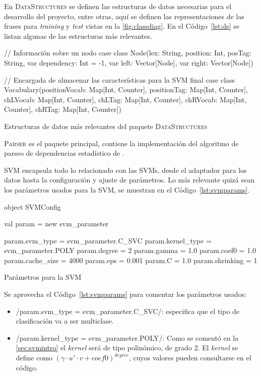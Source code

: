 En \textsc{DataStructures} se definen las estructuras de datos necesarias para
el desarrollo del proyecto, entre otras, aquí se definen las representaciones de
las frases para \emph{training} y \emph{test} vistas en la
\autoref{fig:classdiag}. En el Código~\ref{lst:ds} se listan algunas de las
estructuras más relevantes.
\begin{listing}[ht]
  \begin{scalacode}
    // Información sobre un nodo
    case class Node(lex: String,
                    position: Int,
                    posTag: String,
                    var dependency: Int = -1,
                    var left: Vector[Node],
                    var right: Vector[Node])

    // Encargada de almacenar las características para la SVM
    final case class Vocabulary(positionVocab: Map[Int, Counter],
                                positionTag: Map[Int, Counter],
                                chLVocab: Map[Int, Counter],
                                chLTag: Map[Int, Counter],
                                chRVocab: Map[Int, Counter],
                                chRTag: Map[Int, Counter])
  \end{scalacode}
  \caption{\footnotesize Estructuras de datos más relevantes del paquete
    \textsc{DataStructures}}
  \label{lst:ds}
\end{listing}

\textsc{Parser} es el paquete principal, contiene la implementación del
algoritmo de parseo de dependencias estadístico de \citeauthor{yamada2003}.

\textsc{SVM} encapsula todo lo relacionado con las \acp{SVM}, desde el adaptador
para los datos hasta la configuración y ajuste de parámetros. Lo más relevante
quizá sean los parámetros usados para la \ac{SVM}, se muestran en el
Código~\ref{lst:svmparams}.
\begin{listing}[ht]
  \begin{scalacode}
    object SVMConfig {
      val param = new svm_parameter

      param.svm_type = svm_parameter.C_SVC
      param.kernel_type = svm_parameter.POLY
      param.degree = 2
      param.gamma = 1.0
      param.coef0 = 1.0
      param.cache_size = 4000
      param.eps = 0.001
      param.C = 1.0
      param.shrinking = 1
    }
  \end{scalacode}
  \caption{Parámetros para la \ac{SVM}}
  \label{lst:svmparams}
\end{listing}
Se aprovecha el Código~\ref{lst:svmparams} para comentar los parámetros usados:
\begin{itemize}
\item \scalainline/param.svm_type = svm_parameter.C_SVC/: especifica que el tipo
  de clasificación va a ser multiclase.
\item \scalainline/param.kernel_type = svm_parameter.POLY/: Como se comentó en
  la \autoref{sec:svmintro} el \emph{kernel} será de tipo polinómico, de grado
  2. El \emph{kernel} se define como $(\gamma\cdot u'\cdot v + coef0)^{degree}$,
  cuyos valores pueden consultarse en el código.
\end{itemize}

